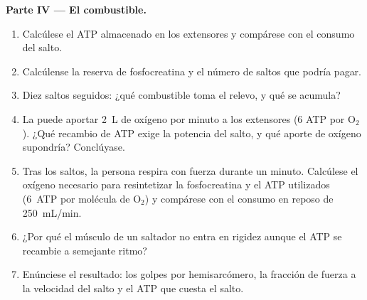 \begin{problem}
\medskip
\noindent\textbf{Parte IV --- El combustible.}
\begin{enumerate}[resume]
  \item Calcúlese el ATP almacenado en los extensores y compárese con el
        consumo del salto.
  \item Calcúlense la reserva de fosfocreatina y el número de saltos que
        podría pagar.
  \item Diez saltos seguidos: ¿qué combustible toma el relevo, y qué se
        acumula?
  \item La  puede aportar \qty{2}{L} de oxígeno por minuto a los
        extensores (6 ATP por $\mathrm{O_2}$). ¿Qué recambio de ATP exige
        la potencia del salto, y qué aporte de oxígeno supondría?
        Conclúyase.
  \item Tras los saltos, la persona respira con fuerza durante un minuto.
        Calcúlese el oxígeno necesario para resintetizar la fosfocreatina
        y el ATP utilizados (\qty{6}{ATP} por molécula de
        $\mathrm{O_2}$) y compárese con el consumo en reposo de
        \qty{250}{mL/min}.
  \item ¿Por qué el músculo de un saltador no entra en rigidez aunque el
        ATP se recambie a semejante ritmo?
  \item Enúnciese el resultado: los golpes por hemisarcómero, la fracción
        de fuerza a la velocidad del salto y el ATP que cuesta el salto.
\end{enumerate}
\end{problem}
